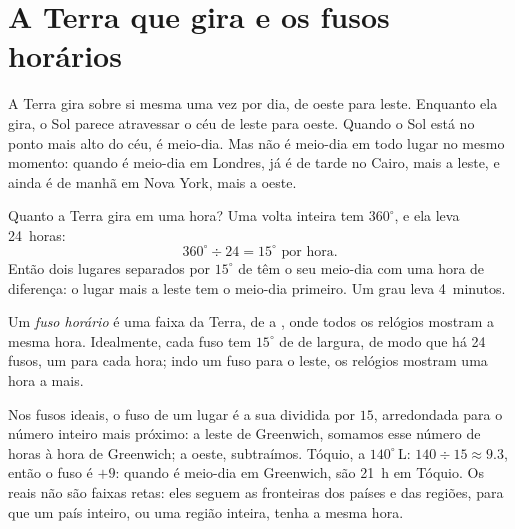 \section{A Terra que gira e os fusos horários}

A Terra gira sobre si mesma uma vez por dia, de oeste para leste. Enquanto
ela gira, o Sol parece atravessar o céu de leste para oeste. Quando o Sol
está no ponto mais alto do céu, é meio-dia. Mas não é meio-dia em todo
lugar no mesmo momento: quando é meio-dia em Londres, já é de tarde no
Cairo, mais a leste, e ainda é de manhã em Nova York, mais a oeste.

Quanto a Terra gira em uma hora? Uma volta inteira tem $360^\circ$, e ela
leva 24~horas:
\[
360^\circ \div 24 = 15^\circ \text{ por hora.}
\]
Então dois lugares separados por $15^\circ$ de  têm o seu
meio-dia com uma hora de diferença: o lugar mais a leste tem o meio-dia
primeiro. Um grau leva 4~minutos.

\begin{definition}\label{def:g6:latitude-longitude:time-zone}
Um \emph{fuso horário} é uma faixa da Terra, de  a
, onde todos os relógios mostram a mesma hora. Idealmente, cada fuso
tem $15^\circ$ de  de largura, de modo que há 24 fusos, um para
cada hora; indo um fuso para o leste, os relógios mostram uma hora a mais.
\end{definition}

Nos fusos ideais, o fuso de um lugar é a sua  dividida por $15$,
arredondada para o número inteiro mais próximo: a leste de Greenwich,
somamos esse número de horas à hora de Greenwich; a oeste, subtraímos.
Tóquio, a $140^\circ$\,L: $140 \div 15 \approx 9.3$, então o fuso é $+9$:
quando é meio-dia em Greenwich, são 21~h em Tóquio. Os  reais
não são faixas retas: eles seguem as fronteiras dos países e das regiões,
para que um país inteiro, ou uma região inteira, tenha a mesma hora.

